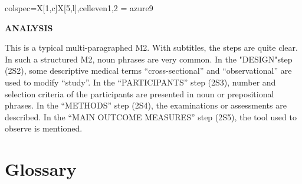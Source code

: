 \documentclass[a4paper]{ctexbook}
\begin{document}
\begin{sample}[label={myautocounter}]{\heiti}
{\begin{tblr}{colspec={X[1,c]X[5,l]},cell{even}{1,2} = {azure9}}
    \bottomrule
  \end{tblr}
  }


  \noindent \textbf{ANALYSIS}

  This is a typical multi-paragraphed M2. With subtitles, the steps are quite clear. In such a structured M2, noun phrases are very common. In the "DESIGN"step (2S2), some descriptive medical terms ``cross-sectional'' and ``observational'' are used to modify ``study''. In the ``PARTICIPANTS'' step (2S3), number and selection criteria of the participants are presented in noun or prepositional phrases. In the ``METHODS'' step (2S4), the examinations or assessments are described. In the ``MAIN OUTCOME MEASURES'' step (2S5), the tool used to observe is mentioned.

\end{sample}

\section{Glossary}
\end{document}
